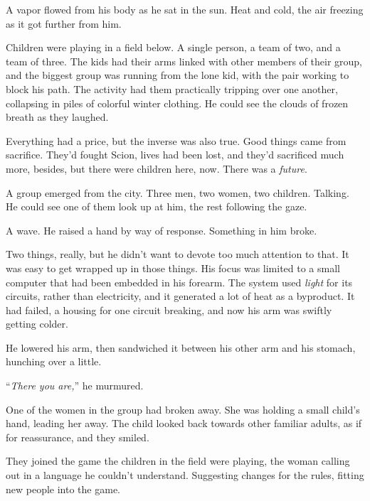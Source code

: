 A vapor flowed from his body as he sat in the sun.  Heat and cold, the air freezing as it got further from him.



Children were playing in a field below.  A single person, a team of two, and a team of three.  The kids had their arms linked with other members of their group, and the biggest group was running from the lone kid, with the pair working to block his path.  The activity had them practically tripping over one another, collapsing in piles of colorful winter clothing.  He could see the clouds of frozen breath as they laughed.



Everything had a price, but the inverse was also true.  Good things came from sacrifice.  They'd fought Scion, lives had been lost, and they'd sacrificed much more, besides, but there were children here, now.  There was a \emph{future}.



A group emerged from the city.  Three men, two women, two children.  Talking.  He could see one of them look up at him, the rest following the gaze.



A wave.  He raised a hand by way of response.  Something in him broke.



Two things, really, but he didn't want to devote too much attention to that.  It was easy to get wrapped up in those things.  His focus was limited to a small computer that had been embedded in his forearm.  The system used \emph{light} for its circuits, rather than electricity, and it generated a lot of heat as a byproduct.  It had failed, a housing for one circuit breaking, and now his arm was swiftly getting colder.



He lowered his arm, then sandwiched it between his other arm and his stomach, hunching over a little.



``\emph{There you are,}'' he murmured.



One of the women in the group had broken away.  She was holding a small child's hand, leading her away.  The child looked back towards other familiar adults, as if for reassurance, and they smiled.



They joined the game the children in the field were playing, the woman calling out in a language he couldn't understand.  Suggesting changes for the rules, fitting new people into the game.



